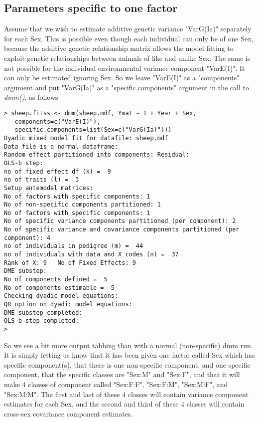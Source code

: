 \documentclass[titlepage]{article}  %
\begin{document}
\subsection{Parameters specific to one factor}

 Assume that we  wish to estimate additive genetic variance "VarG(Ia)" separately for each Sex. This is possible even though each individual can only be of one Sex, because the additive genetic relationship matrix  allows the model fitting to exploit genetic relationships between animals of like and unlike Sex. 
The same is not possible for the individual environmental variance component "VarE(I)". It can only be estimated ignoring Sex. So we leave "VarE(I)" as a "components" argument and put "VarG(Ia)" as a "specific.components" argument in the call to {\em dmm()}, as follows

\begin{verbatim}
> sheep.fitss <- dmm(sheep.mdf, Ymat ~ 1 + Year + Sex,
   components=c("VarE(I)"),
   specific.components=list(Sex=c("VarG(Ia)")))
Dyadic mixed model fit for datafile: sheep.mdf  
Data file is a normal dataframe:
Random effect partitioned into components: Residual:
OLS-b step:
no of fixed effect df (k) =  9 
no of traits (l) =  3 
Setup antemodel matrices:
No of factors with specific components: 1 
No of non-specific components partitioned: 1 
No of factors with specific components: 1 
No of specific variance components partitioned (per component): 2 
No of specific variance and covariance components partitioned (per component): 4 
no of individuals in pedigree (m) =  44 
no of individuals with data and X codes (n) =  37 
Rank of X: 9   No of Fixed Effects: 9 
DME substep:
No of components defined =  5 
No of components estimable =  5 
Checking dyadic model equations:
QR option on dyadic model equations:
DME substep completed:
OLS-b step completed:
> 
\end{verbatim}
So we see a bit more output tabbing than with a normal (non-specific) dmm run. It is simply letting us know that it has been given one factor called Sex which has specific component(s), that there is one non-specific component, and one specific component, that the specific classes are "Sex:M" and "Sex:F", and that it will make 4 classes of component called "Sex:F:F", "Sex:F:M", "Sex:M:F", and  "Sex:M:M". The first and last of these 4 classes will contain variance component  estimates for each Sex, and the second and third of these 4 classes will contain cross-sex covariance component estimates.
\end{document}
